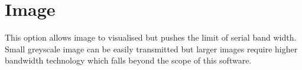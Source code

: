 \section{Image}

This option allows image to visualised but pushes the limit of serial band width.
Small greyscale image can be easily transmitted but larger images require higher bandwidth technology which falls beyond the scope of this software. 
